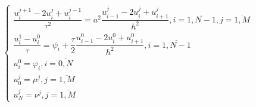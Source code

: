 \documentclass[a4paper,12pt]{report}
\begin{document}
\begin{displaymath}
	\left\{
		\begin{array}{l}
			\dfrac{u_{i}^{j+1} - 2u_{i}^{j} + u_{i}^{j-1}}{\tau^{2}} = a^{2} \dfrac{u_{i-1}^{j} - 2u_{i}^{j} + u_{i+1}^{j}}{h^{2}}, i = \overline{1, N-1}, j= \overline{1, M} \\
			\dfrac{u_{i}^{1} - u_{i}^{0}}{\tau} = \psi_{i} + \dfrac{\tau}{2} \dfrac{u_{i-1}^{0} - 2u_{i}^{0} + u_{i+1}^{0}}{h^{2}}, i= \overline{1, N-1} \\
			u_{i}^{0} = \varphi_{i}, i = \overline{0, N}  \\
			u_{0}^{j} = \mu^{j}, j = \overline{1, M} \\
			u_{N}^{j} = \nu^{j}, j = \overline{1, M}
		\end{array} \right.
\end{displaymath}
\end{document}
